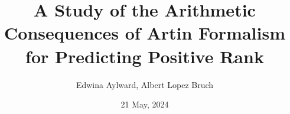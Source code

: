\documentclass{beamer}
\title{A Study of the Arithmetic Consequences of Artin Formalism for
Predicting Positive Rank}
\author{Edwina Aylward, Albert Lopez Bruch}
\date{21 May, 2024}
\theoremstyle{plain}
\begin{document}
\frame{\titlepage}
\end{document}

